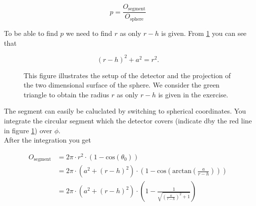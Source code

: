\documentclass[10pt]{article}
\newenvironment{myfont}{\fontfamily{put}\selectfont}{\par}
\begin{document}
\begin{myfont}
\begin{itemize}
  \begin{equation}
    p = \frac{O_{\textrm{segment}}}{O_{\textrm{sphere}}}
  \end{equation}

  \noindent To be able to find $p$ we need to find $r$ as only $r-h$ is given.
  From \ref{fig:ex_4_circle} you can see that

  $$
    (r -h)^{2} + a^{2} = r^{2}.
  $$

  \begin{figure}[H]
    \centering
    \caption{This figure illustrates the setup of the detector and the projection of the two dimensional surface of the sphere.
    We consider the green triangle to obtain the radius $r$ as only $r-h$ is given in the exercise.}
    \label{fig:ex_4_circle}
    \end{figure}

    \noindent The segment can easily be caluclated by switching to spherical coordinates.
    You integrate the circular segment which the detector covers (indicate dby the red line in figure \ref{fig:ex_4_circle}) over $\phi$. \\
    After the integration you get 

    \begin{align*}
      O_{\textrm{segment}} & = 2\pi \cdot r^{2} \cdot \left(1 - \textrm{cos}(\theta_{0})\right) \\
                           & = 2\pi \cdot \left(a^{2} + (r-h)^{2}\right) \cdot \left( 1 - \textrm{cos}\left(\textrm{arctan}\left(\frac{a}{r-h}\right)\right)\right) \\
                           & = 2\pi \cdot \left(a^{2} + (r-h)^{2}\right) \cdot \left(1 - \frac{1}{\sqrt{\left(\frac{a}{r-h}\right)^{2} + 1}} \right)
    \end{align*}


\end{itemize}
\end{myfont}
\end{document}
